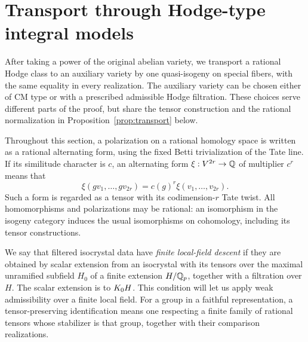 \section{Transport through Hodge-type integral models}
\label{sec:transport}

After taking a power of the original abelian variety, we transport a
rational Hodge class to an auxiliary variety by one quasi-isogeny on
special fibers, with the same equality in every
realization. The auxiliary variety can be chosen either of CM type or
with a prescribed admissible Hodge filtration. These choices serve
different parts of the proof, but share the tensor construction and the
rational normalization in Proposition~\ref{prop:transport} below.

Throughout this section, a polarization on a rational homology space is
written as a rational alternating form, using the fixed Betti
trivialization of the Tate line.  If its similitude character is $c$,
an alternating form $\xi:V^{2r}\to\mathbb Q$ of multiplier $c^r$ means that
\begin{equation}
 \xi(gv_1,\ldots,gv_{2r})=c(g)^r\xi(v_1,\ldots,v_{2r}).
 \label{eq:transport-multiplier}
\end{equation}
Such a form is regarded as a tensor with its codimension-$r$ Tate
twist.  All homomorphisms and polarizations may be rational: an
isomorphism in the isogeny category induces the usual isomorphisms on
cohomology, including its tensor constructions.

We say that filtered isocrystal data have \emph{finite local-field
descent} if they are obtained by scalar extension from an isocrystal
with its tensors over the maximal unramified subfield \(H_0\) of a
finite extension \(H/\mathbb Q_p\), together with a filtration over \(H\).
The scalar extension is to \(K_0 H\). This condition will let us
apply weak admissibility over a finite local field.
For a group in a faithful representation, a tensor-preserving
identification means one respecting a finite family of rational tensors
whose stabilizer is that group, together with their comparison realizations.


